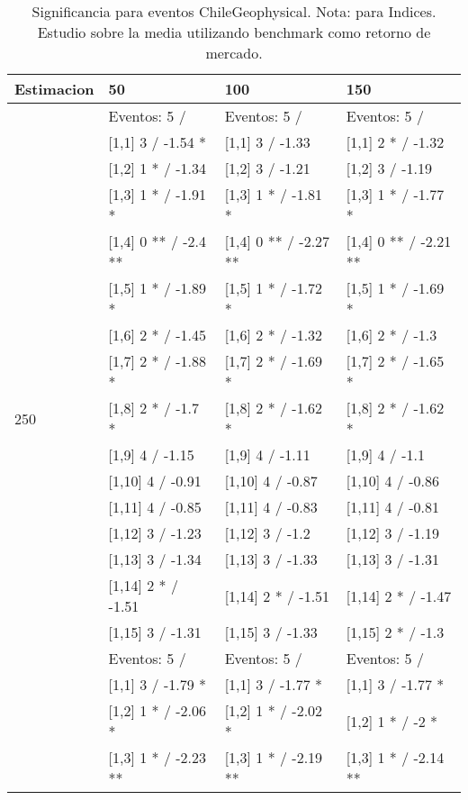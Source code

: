\begin{table}

\caption{Significancia para eventos ChileGeophysical. Nota: para Indices. Estudio sobre la media utilizando benchmark como retorno de mercado.}
\centering
\begin{tabular}[t]{llll}
\toprule
Estimacion & 50 & 100 & 150\\
\midrule
 & Eventos:  5 / & Eventos:  5 / & Eventos:  5 /\\
 & {}[1,1] 3  / -1.54 * & {}[1,1] 3  / -1.33 & {}[1,1] 2 * / -1.32\\
 & {}[1,2] 1 * / -1.34 & {}[1,2] 3  / -1.21 & {}[1,2] 3  / -1.19\\
 & {}[1,3] 1 * / -1.91 * & {}[1,3] 1 * / -1.81 * & {}[1,3] 1 * / -1.77 *\\
 & {}[1,4] 0 ** / -2.4 ** & {}[1,4] 0 ** / -2.27 ** & {}[1,4] 0 ** / -2.21 **\\
\addlinespace
 & {}[1,5] 1 * / -1.89 * & {}[1,5] 1 * / -1.72 * & {}[1,5] 1 * / -1.69 *\\
 & {}[1,6] 2 * / -1.45 & {}[1,6] 2 * / -1.32 & {}[1,6] 2 * / -1.3\\
 & {}[1,7] 2 * / -1.88 * & {}[1,7] 2 * / -1.69 * & {}[1,7] 2 * / -1.65 *\\
250 & {}[1,8] 2 * / -1.7 * & {}[1,8] 2 * / -1.62 * & {}[1,8] 2 * / -1.62 *\\
 & {}[1,9] 4  / -1.15 & {}[1,9] 4  / -1.11 & {}[1,9] 4  / -1.1\\
\addlinespace
 & {}[1,10] 4  / -0.91 & {}[1,10] 4  / -0.87 & {}[1,10] 4  / -0.86\\
 & {}[1,11] 4  / -0.85 & {}[1,11] 4  / -0.83 & {}[1,11] 4  / -0.81\\
 & {}[1,12] 3  / -1.23 & {}[1,12] 3  / -1.2 & {}[1,12] 3  / -1.19\\
 & {}[1,13] 3  / -1.34 & {}[1,13] 3  / -1.33 & {}[1,13] 3  / -1.31\\
 & {}[1,14] 2 * / -1.51 & {}[1,14] 2 * / -1.51 & {}[1,14] 2 * / -1.47\\
\addlinespace
 & {}[1,15] 3  / -1.31 & {}[1,15] 3  / -1.33 & {}[1,15] 2 * / -1.3\\
 & Eventos:  5 / & Eventos:  5 / & Eventos:  5 /\\
 & {}[1,1] 3  / -1.79 * & {}[1,1] 3  / -1.77 * & {}[1,1] 3  / -1.77 *\\
 & {}[1,2] 1 * / -2.06 * & {}[1,2] 1 * / -2.02 * & {}[1,2] 1 * / -2 *\\
 & {}[1,3] 1 * / -2.23 ** & {}[1,3] 1 * / -2.19 ** & {}[1,3] 1 * / -2.14 **\\

\end{tabular}
\end{table}

